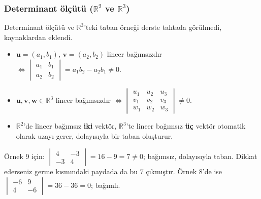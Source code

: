 \subsubsection{Determinant ölçütü ($\mathbb R^2$ ve $\mathbb R^3$)}

\begin{bilgi}
Determinant ölçütü ve $\mathbb R^3$'teki taban örneği derste tahtada görülmedi, kaynaklardan eklendi.
\end{bilgi}

\begin{teorem}
\begin{itemize}
\item $\mathbf u=(a_1,b_1)$, $\mathbf v=(a_2,b_2)$ lineer bağımsızdır $\iff \begin{vmatrix}a_1&b_1\\a_2&b_2\end{vmatrix}=a_1b_2-a_2b_1\neq 0$.
\item $\mathbf u,\mathbf v,\mathbf w\in\mathbb R^3$ lineer bağımsızdır $\iff \begin{vmatrix}u_1&u_2&u_3\\v_1&v_2&v_3\\w_1&w_2&w_3\end{vmatrix}\neq 0$.
\item $\mathbb R^2$'de lineer bağımsız \textbf{iki} vektör, $\mathbb R^3$'te lineer bağımsız \textbf{üç} vektör otomatik olarak uzayı gerer, dolayısıyla bir taban oluşturur.
\end{itemize}
\end{teorem}

Örnek 9 için: $\begin{vmatrix}4&-3\\-3&4\end{vmatrix}=16-9=7\neq0$; bağımsız, dolayısıyla taban. Dikkat ederseniz germe kısmındaki paydada da bu $7$ çıkmıştır. Örnek 8'de ise $\begin{vmatrix}-6&9\\4&-6\end{vmatrix}=36-36=0$; bağımlı.

